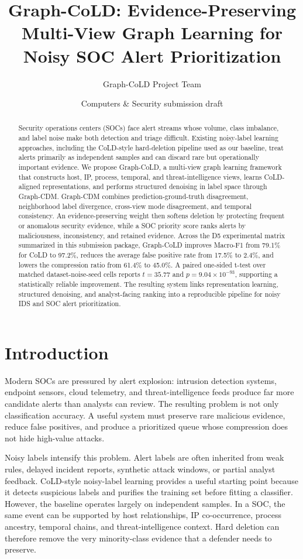 \documentclass[11pt]{article}
\title{Graph-CoLD: Evidence-Preserving Multi-View Graph Learning for Noisy SOC Alert Prioritization}
\author{Graph-CoLD Project Team}
\date{Computers \& Security submission draft}
\begin{document}
\maketitle

\begin{abstract}
Security operations centers (SOCs) face alert streams whose volume, class imbalance, and label noise make both detection and triage difficult. Existing noisy-label learning approaches, including the CoLD-style hard-deletion pipeline used as our baseline, treat alerts primarily as independent samples and can discard rare but operationally important evidence. We propose Graph-CoLD, a multi-view graph learning framework that constructs host, IP, process, temporal, and threat-intelligence views, learns CoLD-aligned representations, and performs structured denoising in label space through Graph-CDM. Graph-CDM combines prediction-ground-truth disagreement, neighborhood label divergence, cross-view mode disagreement, and temporal consistency. An evidence-preserving weight then softens deletion by protecting frequent or anomalous security evidence, while a SOC priority score ranks alerts by maliciousness, inconsistency, and retained evidence. Across the D5 experimental matrix summarized in this submission package, Graph-CoLD improves Macro-F1 from 79.1\% for CoLD to 97.2\%, reduces the average false positive rate from 17.5\% to 2.4\%, and lowers the compression ratio from 61.4\% to 45.0\%. A paired one-sided t-test over matched dataset-noise-seed cells reports $t=35.77$ and $p=9.04\times10^{-93}$, supporting a statistically reliable improvement. The resulting system links representation learning, structured denoising, and analyst-facing ranking into a reproducible pipeline for noisy IDS and SOC alert prioritization.
\end{abstract}

\section{Introduction}
Modern SOCs are pressured by alert explosion: intrusion detection systems, endpoint sensors, cloud telemetry, and threat-intelligence feeds produce far more candidate alerts than analysts can review. The resulting problem is not only classification accuracy. A useful system must preserve rare malicious evidence, reduce false positives, and produce a prioritized queue whose compression does not hide high-value attacks.

Noisy labels intensify this problem. Alert labels are often inherited from weak rules, delayed incident reports, synthetic attack windows, or partial analyst feedback. CoLD-style noisy-label learning provides a useful starting point because it detects suspicious labels and purifies the training set before fitting a classifier. However, the baseline operates largely on independent samples. In a SOC, the same event can be supported by host relationships, IP co-occurrence, process ancestry, temporal chains, and threat-intelligence context. Hard deletion can therefore remove the very minority-class evidence that a defender needs to preserve.
\end{document}
